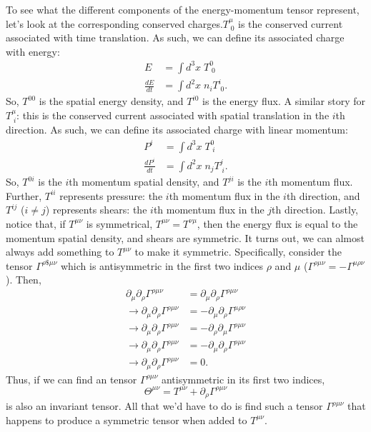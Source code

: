 \noindent To see what the different components of the energy-momentum tensor represent, let's look at the corresponding conserved charges.$T^\mu_{\;0}$ is the conserved current associated with time translation. As such, we can define its associated charge with energy:
\begin{align*}
    E &= \int d^3x\;T^0_{\;0}\\
    \frac{dE}{dt}&=\int d^2x \; n_iT^i_{\;0}.
\end{align*}
So, $T^{00}$ is the spatial energy density, and $T^{i0}$ is the energy flux. A similar story for $T^\mu_{\;i}$: this is the conserved current associated with spatial translation in the $i$th direction. As such, we can define its associated charge with linear momentum:
\begin{align*}
    P^i&=\int d^3x\;T^0_{\;i}\\
    \frac{dP^i}{dt} &= \int d^2x\;n_jT^j_{\;i}.
\end{align*}
So, $T^{0i}$ is the $i$th momentum spatial density, and $T^{ji}$ is the $i$th momentum flux. Further, $T^{ii}$ represents pressure: the $i$th momentum flux in the $i$th direction, and $T^{ij}$ ($i\ne j$) represents shears: the $i$th momentum flux in the $j$th direction. Lastly, notice that, if $T^{\mu\nu}$ is symmetrical, $T^{\mu\nu}=T^{\nu\mu}$, then the energy flux is equal to the momentum spatial density, and shears are symmetric. It turns out, we can almost always add something to $T^{\mu\nu}$ to make it symmetric. Specifically, consider the tensor  $\Gamma^{\rho\$\mu\nu}$ which is antisymmetric in the first two indices $\rho$ and $\mu$ ($\Gamma^{\rho\mu\nu}=-\Gamma^{\mu\rho\nu}$). Then, 
\begin{align*}
    \partial_\mu\partial_\rho\Gamma^{\rho\mu\nu} &=\partial_\mu\partial_\rho\Gamma^{\rho\mu\nu}\\
    \rightarrow \partial_\mu\partial_\rho \Gamma^{\rho\mu\nu} &= -\partial_\mu\partial_\rho\Gamma^{\mu\rho\nu}\\
    \rightarrow \partial_\mu\partial_\rho\Gamma^{\rho\mu\nu}&=-\partial_\rho\partial_\mu\Gamma^{\rho\mu\nu}\\
    \rightarrow \partial_\mu\partial_\rho\Gamma^{\rho\mu\nu}&=-\partial_\mu\partial_\rho\Gamma^{\rho\mu\nu}\\
    \rightarrow \partial_\mu\partial_\rho\Gamma^{\rho\mu\nu} &= 0.    
\end{align*}
Thus, if we can find an tensor $\Gamma^{\rho\mu\nu}$ antisymmetric in its first two indices,
\[
    \Theta^{\mu\nu}= T^{\mu\nu} + \partial_\rho\Gamma^{\rho\mu\nu}
\]
is also an invariant tensor. All that we'd have to do is find such a tensor $\Gamma^{\rho\mu\nu}$ that happens to produce a symmetric tensor when added to $T^{\mu\nu}$.
